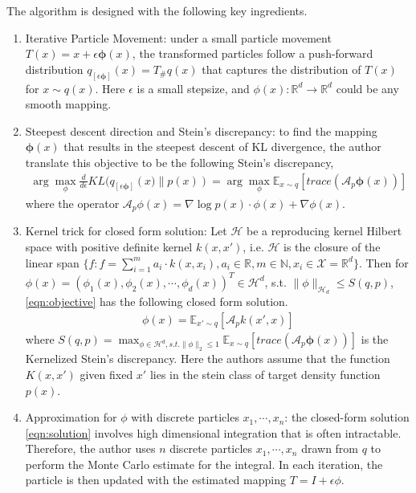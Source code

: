 The algorithm is designed with the following key ingredients.

\begin{enumerate}
    \item Iterative Particle Movement: under a small particle movement $T(x) = x + \epsilon \mathbf{\phi}(x)$, the transformed particles follow a push-forward distribution $q_{[\epsilon\mathbf{\phi}]}(x) = T_{\#}q(x)$ that captures the distribution of $T(x)$ for $x\sim q(x)$. Here $\epsilon$ is a small stepsize, and $\phi(x): \mathbb{R}^d\rightarrow \mathbb{R}^d$ could be any smooth mapping.
    \item Steepest descent direction and Stein's discrepancy: to find the mapping $\mathbf{\phi}(x)$ that results in the steepest descent of KL divergence, the author translate this objective to be the following Stein's discrepancy,
    \begin{align}
    \label{eqn:objective}
         \arg\max_\phi\frac{d}{d \epsilon}KL(q_{[\epsilon\mathbf{\phi}]}\left(x)\lVert p(x)\right) = \arg\max_\phi \mathbb{E}_{x\sim q}\left[trace\left(\mathcal{A}_p \mathbf{\phi}(x)\right)\right]
    \end{align}
    where the operator $\mathcal{A}_p \phi(x)= \nabla \log p(x) \cdot \phi(x) + \nabla\phi(x)$.
    \item Kernel trick for closed form solution: Let $\mathcal{H}$ be a reproducing kernel Hilbert space with positive definite kernel $k(x,x')$, i.e. $\mathcal{H}$ is the closure of the linear span $\{f: f = \sum_{i=1}^m a_i \cdot k(x, x_i), a_i\in \mathbb{R}, m\in \mathbb{N}, x_i\in \mathcal{X}=\mathbb{R}^d \}$. Then for $\phi(x) = \left(\phi_1(x), \phi_2(x), \cdots, \phi_d(x)\right)^T \in \mathcal{H}^d$, s.t. $\lVert\phi\rVert_{\mathcal{H}_d}\leq S(q, p)$, \eqref{eqn:objective}  has the following closed form solution.
    \begin{align}
    \label{eqn:solution}
        \phi(x) = \mathbb{E}_{x'\sim q}\left[ \mathcal{A}_p k(x', x) \right]
    \end{align}
    where $S(q, p) = \max_{\phi\in \mathcal{H}^d, s.t. \lVert\phi\rVert_2\leq 1} \mathbb{E}_{x\sim q}\left[trace\left(\mathcal{A}_p \mathbf{\phi}(x)\right)\right]$ is the Kernelized Stein's discrepancy. Here the authors assume that the function $K(x, x')$ given fixed $x'$ lies in the stein class of target density function $p(x)$.
    \item Approximation for $\phi$ with discrete particles $x_1, \cdots, x_n$: the closed-form solution \eqref{eqn:solution} involves high dimensional integration that is often intractable. Therefore, the author uses $n$ discrete particles $x_1, \cdots, x_n$ drawn from $q$ to perform the Monte Carlo estimate for the integral. In each iteration, the particle is then updated with the estimated mapping $T = I + \epsilon \phi$.
\end{enumerate}


